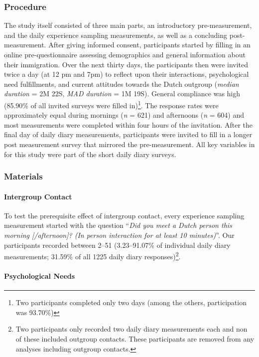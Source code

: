 \subsubsection{Procedure}

The study itself consisted of three main parts, an introductory
pre-measurement, and the daily experience sampling measurements, as well
as a concluding post-measurement. After giving informed consent,
participants started by filling in an online pre-questionnaire assessing
demographics and general information about their immigration. Over the
next thirty days, the participants then were invited twice a day (at 12
pm and 7pm) to reflect upon their interactions, psychological need
fulfillments, and current attitudes towards the Dutch outgroup
(\textit{median duration} = 2M 22S, \textit{MAD duration} = 1M 19S).
General compliance was high (85.90\% of all invited surveys were filled
in)\footnote{Two participants completed only two days (among the others, participation was 93.70\%)}.
The response rates were approximately equal during mornings (\textit{n}
= 621) and afternoons (\textit{n} = 604) and most measurements were
completed within four hours of the invitation. After the final day of
daily diary measurements, participants were invited to fill in a longer
post measurement survey that mirrored the pre-measurement. All key
variables in for this study were part of the short daily diary surveys.

\subsubsection{Materials}

\paragraph{Intergroup Contact}

To test the prerequisite effect of intergroup contact, every experience
sampling measurement started with the question
``\textit{Did you meet a Dutch person this morning [/afternoon]? (In person interaction for at least 10 minutes)}''.
Our participants recorded between 2--51 (3.23--91.07\% of individual
daily diary measurements; 31.59\% of all 1225 daily diary
responses)\footnote{Two participants only recorded two daily diary measurements each and non of these included outgroup contacts. These participants are removed from any analyses including outgroup contacts.}.

\paragraph{Psychological Needs}

